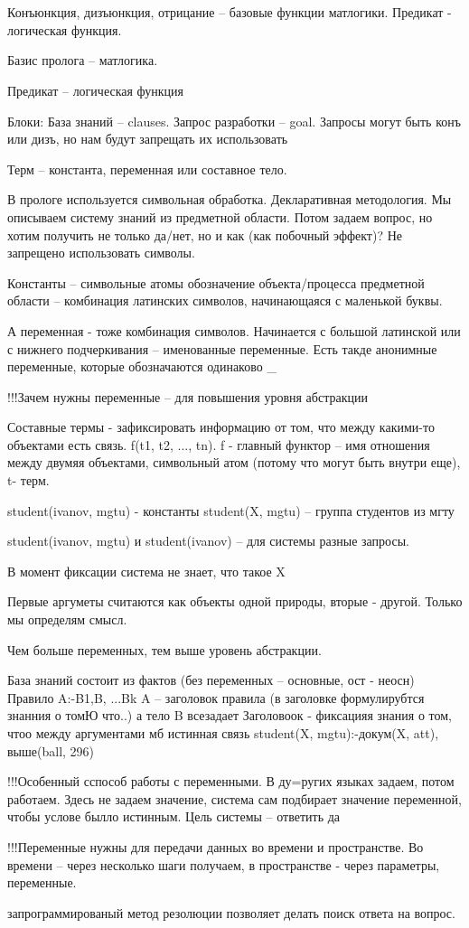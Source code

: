 \documentclass[12pt]{report}
\begin{document}
\section*{}
Конъюнкция, дизъюнкция, отрицание  --  базовые функции матлогики. Предикат - логическая функция.

Базис пролога -- матлогика.

Предикат -- логическая функция

Блоки:
База знаний --  clauses.
Запрос разработки -- goal.
Запросы могут быть конъ или дизъ, но нам будут запрещать их использовать

Терм -- константа, переменная или составное тело.

В прологе используется символьная обработка. Декларативная методология. Мы описываем систему знаний из предметной области. Потом задаем вопрос, но хотим получить не только да/нет, но и как (как побочный эффект)? Не запрещено использовать символы. 

Константы -- символьные атомы обозначение объекта/процесса предметной области -- комбинация латинских символов, начинающаяся с маленькой буквы.

А переменная - тоже комбинация символов. Начинается с большой латинской или с нижнего подчеркивания -- именованные переменные. Есть такде анонимные переменные, которые обозначаются одинаково \_

!!!Зачем нужны переменные -- для повышения уровня абстракции

Составные термы - зафиксировать информацию от том, что между какими-то объектами есть связь. f(t1, t2, ..., tn). f - главный функтор -- имя отношения между двумяя объектами, символьный атом (потому что могут быть внутри еще), t- терм.


student(ivanov, mgtu) - константы
student(X, mgtu) -- группа студентов из мгту

student(ivanov, mgtu) и student(ivanov) -- для системы разные запросы.

В момент фиксации система не знает, что такое X


Первые аргуметы считаются как объекты одной природы, вторые - другой. Только мы определям смысл.

Чем больше переменных, тем выше уровень абстракции.

База знаний состоит из фактов (без переменных -- основные, ост - неосн)
Правило
A:-B1,B, ...Bk
A -- заголовок правила (в заголовке формулирубтся знанния о томЮ что..) а тело B всезадает 
Заголовоок - фиксацияя знания о том, чтоо между аргументами мб истинная связь
student(X, mgtu):-докум(X, att), выше(ball, 296)

!!!Особенный сспособ работы с переменными. В ду=ругих языках задаем, потом работаем. Здесь не задаем значение, система сам подбирает значение переменной, чтобы услове былло истинным.  Цель системы -- ответить да

!!!Переменные нужны для передачи данных во времени и пространстве.  Во времени -- через несколько шаги получаем, в пространстве - через параметры, переменные.

запрограммированый метод резолюции позволяет делать поиск ответа на вопрос.
\end{document}
